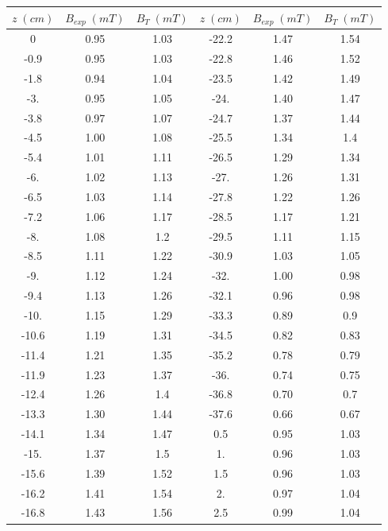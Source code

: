 \documentclass[a4paper,12pt,titlepage]{article}
\begin{document}
\begin{longtable}[ht]{|c|c|c|c|c|c|}
    \hline
    $z \; (cm)$ & $B_{exp} \; (mT)$ & $B_T \; (mT)$ & $z \; (cm)$ & $B_{exp} \; (mT)$ & $B_T \; (mT)$ \\ \hline
    0     & 0.95 & 1.03 & -22.2 & 1.47 & 1.54 \\ \hline
    -0.9  & 0.95 & 1.03 & -22.8 & 1.46 & 1.52 \\ \hline
    -1.8  & 0.94 & 1.04 & -23.5 & 1.42 & 1.49 \\ \hline
    -3.   & 0.95 & 1.05 & -24.  & 1.40 & 1.47 \\ \hline
    -3.8  & 0.97 & 1.07 & -24.7 & 1.37 & 1.44 \\ \hline
    -4.5  & 1.00 & 1.08 & -25.5 & 1.34 & 1.4  \\ \hline
    -5.4  & 1.01 & 1.11 & -26.5 & 1.29 & 1.34 \\ \hline
    -6.   & 1.02 & 1.13 & -27.  & 1.26 & 1.31 \\ \hline
    -6.5  & 1.03 & 1.14 & -27.8 & 1.22 & 1.26 \\ \hline
    -7.2  & 1.06 & 1.17 & -28.5 & 1.17 & 1.21 \\ \hline
    -8.   & 1.08 & 1.2  & -29.5 & 1.11 & 1.15 \\ \hline
    -8.5  & 1.11 & 1.22 & -30.9 & 1.03 & 1.05 \\ \hline
    -9.   & 1.12 & 1.24 & -32.  & 1.00 & 0.98 \\ \hline
    -9.4  & 1.13 & 1.26 & -32.1 & 0.96 & 0.98 \\ \hline
    -10.  & 1.15 & 1.29 & -33.3 & 0.89 & 0.9  \\ \hline
    -10.6 & 1.19 & 1.31 & -34.5 & 0.82 & 0.83 \\ \hline
    -11.4 & 1.21 & 1.35 & -35.2 & 0.78 & 0.79 \\ \hline
    -11.9 & 1.23 & 1.37 & -36.  & 0.74 & 0.75 \\ \hline
    -12.4 & 1.26 & 1.4  & -36.8 & 0.70 & 0.7  \\ \hline
    -13.3 & 1.30 & 1.44 & -37.6 & 0.66 & 0.67 \\ \hline
    -14.1 & 1.34 & 1.47 & 0.5   & 0.95 & 1.03 \\ \hline
    -15.  & 1.37 & 1.5  & 1.    & 0.96 & 1.03 \\ \hline
    -15.6 & 1.39 & 1.52 & 1.5   & 0.96 & 1.03 \\ \hline
    -16.2 & 1.41 & 1.54 & 2.    & 0.97 & 1.04 \\ \hline
    -16.8 & 1.43 & 1.56 & 2.5   & 0.99 & 1.04 \\ \hline

\end{longtable}
\end{document}
